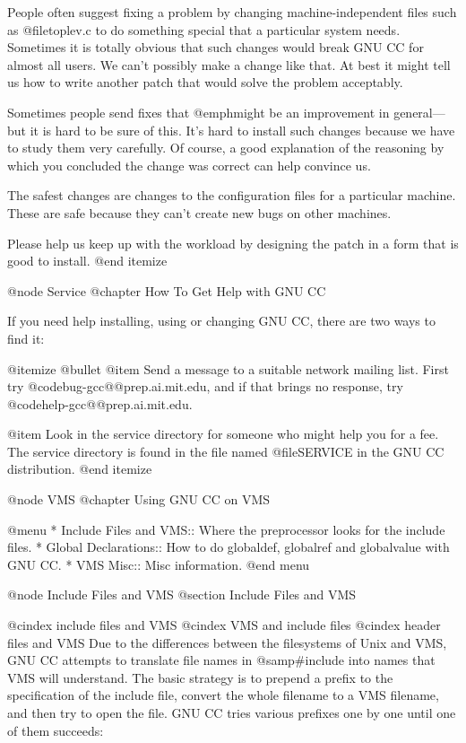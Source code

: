 People often suggest fixing a problem by changing machine-independent
files such as @file{toplev.c} to do something special that a particular
system needs.  Sometimes it is totally obvious that such changes would
break GNU CC for almost all users.  We can't possibly make a change like
that.  At best it might tell us how to write another patch that would
solve the problem acceptably.

Sometimes people send fixes that @emph{might} be an improvement in
general---but it is hard to be sure of this.  It's hard to install
such changes because we have to study them very carefully.  Of course,
a good explanation of the reasoning by which you concluded the change
was correct can help convince us.

The safest changes are changes to the configuration files for a
particular machine.  These are safe because they can't create new bugs
on other machines.

Please help us keep up with the workload by designing the patch in a
form that is good to install.
@end itemize

@node Service
@chapter How To Get Help with GNU CC

If you need help installing, using or changing GNU CC, there are two
ways to find it:

@itemize @bullet
@item
Send a message to a suitable network mailing list.  First try
@code{bug-gcc@@prep.ai.mit.edu}, and if that brings no response, try
@code{help-gcc@@prep.ai.mit.edu}.

@item
Look in the service directory for someone who might help you for a fee.
The service directory is found in the file named @file{SERVICE} in the
GNU CC distribution.
@end itemize

@node VMS
@chapter Using GNU CC on VMS

@menu
* Include Files and VMS::  Where the preprocessor looks for the include files.
* Global Declarations::    How to do globaldef, globalref and globalvalue with
                           GNU CC.
* VMS Misc::		   Misc information.
@end menu

@node Include Files and VMS
@section Include Files and VMS

@cindex include files and VMS
@cindex VMS and include files
@cindex header files and VMS
Due to the differences between the filesystems of Unix and VMS, GNU CC
attempts to translate file names in @samp{#include} into names that VMS
will understand.  The basic strategy is to prepend a prefix to the
specification of the include file, convert the whole filename to a VMS
filename, and then try to open the file.  GNU CC tries various prefixes
one by one until one of them succeeds:

